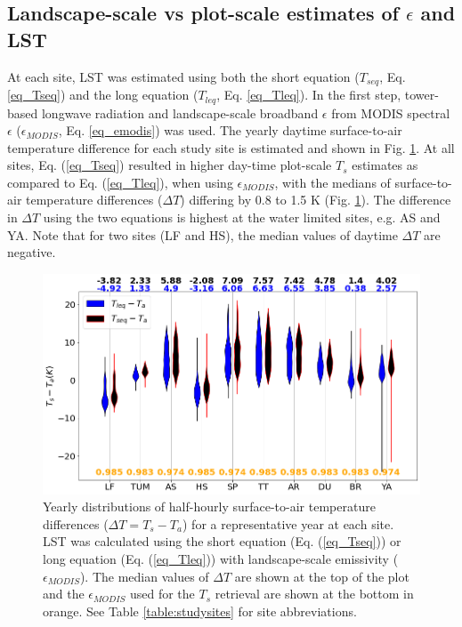 \documentclass[fleqn,10pt]{wlscirep}
\begin{document}
\subsection{Landscape-scale vs plot-scale estimates of $\epsilon$ and LST}
At each site, LST was estimated using both the short equation ($T_{seq}$, Eq. \ref{eq_Tseq}) and the long equation ($T_{leq}$, Eq. \ref{eq_Tleq}). In the first step, tower-based longwave radiation and landscape-scale broadband $\epsilon$ from MODIS spectral $\epsilon$ ($\epsilon_{MODIS}$, Eq. \ref{eq_emodis}) was used. The yearly daytime surface-to-air temperature difference for each study site is estimated and shown in Fig. \ref{fig:long_short_eq_epsilon_MODIS}. At all sites, Eq. (\ref{eq_Tseq}) resulted in higher day-time plot-scale $T_{s}$ estimates as compared to Eq. (\ref{eq_Tleq}), when using $\epsilon_{MODIS}$, with the medians of surface-to-air temperature differences ($\Delta T$) differing by 0.8 to 1.5 K (Fig. \ref{fig:long_short_eq_epsilon_MODIS}). The difference in $\Delta T$ using the two equations is highest at the water limited sites, e.g. AS and YA. Note that for two sites (LF and HS), the median values of daytime $\Delta T$ are negative.
\begin{figure}[h!]
	\includegraphics[scale=0.35]{tsta_violion.png} %
	\centering
    \caption{
     Yearly distributions of half-hourly surface-to-air temperature differences ($\Delta T = T_s - T_a$) for a representative year at each site.  
    LST was calculated using the short equation (Eq. (\ref{eq_Tseq})) or long equation (Eq. (\ref{eq_Tleq})) with landscape-scale emissivity ($\epsilon_{MODIS}$). The median values of $\Delta T$ are shown at the top of the plot and the  $\epsilon_{MODIS}$ used for the $T_{s}$ retrieval are shown at the bottom in orange. See Table \ref{table:studysites} for site abbreviations.}
	\label{fig:long_short_eq_epsilon_MODIS}
\end{figure}
\end{document}
